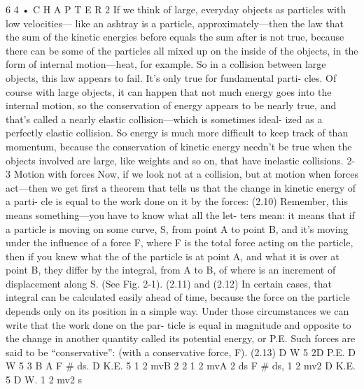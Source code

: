 \documentclass[10pt,oneside]{article}
\begin{document}
6 4 • C H A P T E R  2 If we think of large, everyday objects as particles with low velocities--- like an ashtray is a particle, approximately---then the law that the sum of the kinetic energies before equals the sum after is not true, because there can be some of the particles all mixed up on the inside of the objects, in the form of internal motion---heat, for example. So in a collision between large objects, this law appears to fail. It’s only true for fundamental parti- cles. Of course with large objects, it can happen that not much energy goes into the internal motion, so the conservation of energy appears to be nearly true, and that’s called a nearly elastic collision---which is sometimes ideal- ized as a perfectly elastic collision. So energy is much more difficult to keep track of than momentum, because the conservation of kinetic energy needn’t be true when the objects involved are large, like weights and so on, that have inelastic collisions. 2-3 Motion with forces Now, if we look not at a collision, but at motion when forces act---then we get first a theorem that tells us that the change in kinetic energy of a parti- cle is equal to the work done on it by the forces: (2.10) Remember, this means something---you have to know what all the let- ters mean: it means that if a particle is moving on some curve, S, from point A to point B, and it’s moving under the influence of a force F, where F is the total force acting on the particle, then if you knew what the of the particle is at point A, and what it is over at point B, they differ by the integral, from A to B, of where is an increment of displacement along S. (See Fig. 2-1). (2.11) and (2.12) In certain cases, that integral can be calculated easily ahead of time, because the force on the particle depends only on its position in a simple way. Under those circumstances we can write that the work done on the par- ticle is equal in magnitude and opposite to the change in another quantity called its potential energy, or P.E. Such forces are said to be “conservative”: (with a conservative force, F). (2.13) D W 5 2D P.E. D W 5 3 B A F \# ds. D K.E. 5 1 2 mvB 2 2 1 2 mvA 2 ds F \# ds, 1 2 mv2 D K.E. 5 D W. 1 2 mv2 s\par
\end{document}

